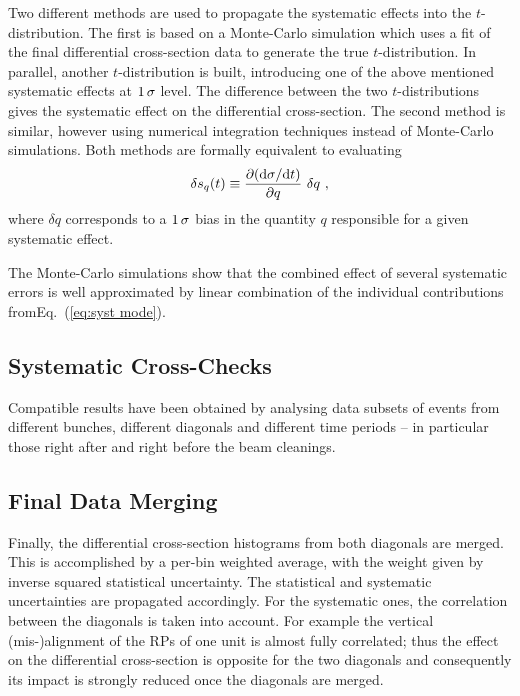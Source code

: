 Two different methods are used to propagate the systematic effects into the $t$-distribution. The first is based on a Monte-Carlo simulation which uses a fit of the final differential cross-section data to generate the true $t$-distribution. In parallel, another $t$-distribution is built, introducing one of the above mentioned systematic effects at $1\,{\rm \sigma}$ level. The difference between the two $t$-distributions gives the systematic effect on the differential cross-section. The second method is similar, however using numerical integration techniques instead of Monte-Carlo simulations. Both methods are formally equivalent to evaluating
\begin{equation}
\label{eq:syst mode}
\delta s_{q}(t) \equiv \frac{\partial(\d\sigma/\d t)}{\partial q}\ \delta q\ ,
\end{equation}
where $\delta q$ corresponds to a $1\,{\rm \sigma}$ bias in the quantity $q$ responsible for a given systematic effect.

The Monte-Carlo simulations show that the combined effect of several systematic errors is well approximated by linear combination of the individual contributions from\Break Eq.~(\ref{eq:syst mode}).



\subsection{Systematic Cross-Checks}
\label{sec:cross checks}

Compatible results have been obtained by analysing data subsets of events from different bunches, different diagonals and different time periods -- in particular those right after and right before the beam cleanings.



\subsection{Final Data Merging}
\label{sec:final data merging}

Finally, the differential cross-section histograms from both diagonals are merged. This is accomplished by a per-bin weighted average, with the weight given by inverse squared statistical uncertainty. The statistical and systematic uncertainties are propagated accordingly. For the systematic ones, the correlation between the diagonals is taken into account. For example the vertical (mis-)alignment of the RPs of one unit is almost fully correlated; thus the effect on the differential cross-section is opposite for the two diagonals and consequently its impact is strongly reduced once the diagonals are merged.

